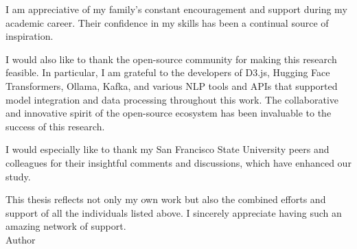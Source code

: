 \documentclass[
12pt,
english,
onehalfspacing,
headsepline,
draft,  %
]{MastersDoctoralThesis}
\begin{document}
\begin{singlespacing}

\begin{acknowledgements}
\addchaptertocentry{\acknowledgementname}

\setlength{\parskip}{10pt plus 1pt minus 1pt}

I am appreciative of my family's constant encouragement and support during my academic career. Their confidence in my skills has been a continual source of inspiration.

I would also like to thank the open-source community for making this research feasible. In particular, I am grateful to the developers of D3.js, Hugging Face Transformers, Ollama, Kafka, and various NLP tools and APIs that supported model integration and data processing throughout this work. The collaborative and innovative spirit of the open-source ecosystem has been invaluable to the success of this research.

I would especially like to thank my San Francisco State University peers and colleagues for their insightful comments and discussions, which have enhanced our study.

This thesis reflects not only my own work but also the combined efforts and support of all the individuals listed above. I sincerely appreciate having such an amazing network of support.\\[2cm]

\noindent
Author\\
\authorname

\end{acknowledgements}

\newpage

\end{singlespacing}

\end{document}

